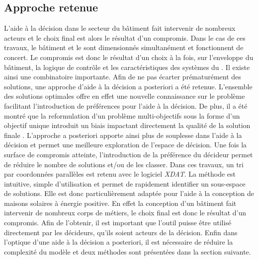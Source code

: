 \subsection{Approche retenue} %
\label{sub:approche_retenue}
L’aide à la décision dans le secteur du bâtiment fait intervenir de nombreux acteurs et le
choix final est alors le résultat d’un compromis. Dans le cas de ces travaux, le bâtiment
et le  sont dimensionnés simultanément et fonctionnent de concert. Le compromis
est donc le résultat d’un choix à la fois, sur l’enveloppe du bâtiment, la logique de
contrôle et les caractéristiques des systèmes du . Il existe ainsi une
combinatoire importante. Afin de ne pas écarter prématurément des solutions, une approche
d’aide à la décision a posteriori a été retenue. L’ensemble des solutions optimales offre
en effet une nouvelle connaissance sur le problème facilitant l’introduction de
préférences pour l’aide à la décision. De plus, il a été montré que la reformulation d’un
problème multi-objectifs sous la forme d’un objectif unique introduit un biais impactant
directement la qualité de la solution finale \parencite{Blondeau2002165}. L’approche a
posteriori apporte ainsi plus de souplesse dans l’aide à la décision et permet une
meilleure exploration de l’espace de décision. Une fois la surface de compromis atteinte,
l’introduction de la préférence du décideur permet de réduire le nombre de solutions et/ou
de les classer. Dans ces travaux, un tri par coordonnées parallèles est retenu avec le
logiciel \textit{XDAT}. La méthode est intuitive, simple d’utilisation et permet de
rapidement identifier un sous-espace de solutions. Elle est donc particulièrement adaptée
pour l’aide à la conception de maisons solaires à énergie positive. En effet la conception
d’un bâtiment fait intervenir de nombreux corps de métiers, le choix final est donc le
résultat d’un compromis. Afin de l’obtenir, il est important que l’outil puisse être
utilisé directement par les décideurs, qu’ils soient acteurs de la décision.
Enfin dans l’optique d’une aide à la décision a posteriori, il est nécessaire de réduire la
complexité du modèle et deux méthodes sont présentées dans la section suivante.




